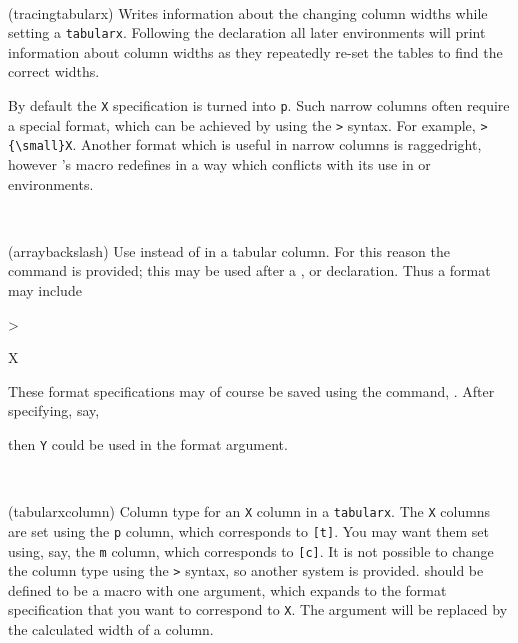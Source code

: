 \begin{syntax}
\cmd{\tracingtabularx} \\
\end{syntax}
\glossary(tracingtabularx)%
  {}%
  {Writes information about the changing column widths while setting
   a \texttt{tabularx}.}
Following the \cmd{\tracingtabularx} declaration all
later  environments will print information
 about column widths as they repeatedly re-set the tables to find the
 correct widths.


 By default the \texttt{X} specification is turned into
 \verb?p?. Such narrow columns often
 require a special format, which can be achieved by using the \verb?>? syntax.
For example, \verb?>{\small}X?. Another format which is useful in narrow 
columns is  raggedright, 
however \ltx's \cmd{\raggedright} macro redefines
\cmd{\\} in a way which conflicts with its use in   or 
  environments.

\begin{syntax}
\cmd{\arraybackslash} \\
\end{syntax}
\glossary(arraybackslash)%
  {}%
  {Use instead of \Vprint{\\} in a tabular column.}
 For this reason the command \cmd{\arraybackslash} is provided;
this may be used after a \cmd{\raggedright}, \cmd{\raggedleft}  or
\cmd{\centering} declaration. Thus a  format may include
\begin{lcode}
>{\raggedright\arraybackslash}X
\end{lcode}
 These format specifications may of course be saved using the
 command, \cmd{\newcolumntype}. 
After specifying, say,
\begin{lcode}
\end{lcode}
then \texttt{Y} could be used in the  format
 argument.

 
\begin{syntax}
\cmd{\tabularxcolumn} \\
\end{syntax}
\glossary(tabularxcolumn)%
  {}%
  {Column type for an \texttt{X} column in a \texttt{tabularx}.}
 The \texttt{X} columns are set using the \texttt{p} column, which
 corresponds  to \cmd{\parbox}\verb?[t]?. You may want them set using, say, the
\texttt{m} column, which corresponds to \cmd{\parbox}\verb?[c]?. It is not
 possible to change the column type using the \texttt{>} syntax, so another
 system is provided.  \cmd{\tabularxcolumn} should be defined to be a macro
 with one argument, which expands to the  format
 specification that you want to correspond to \texttt{X}. The
 argument will be replaced by the calculated width of a column.

